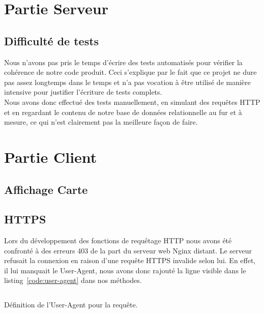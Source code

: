 \section{Partie Serveur}
	\subsection{Difficulté de tests}
		Nous n'avons pas pris le temps d'écrire des tests automatisés pour vérifier la cohérence de notre code produit. Ceci s'explique par le fait que ce projet ne dure pas assez longtemps dans le temps et n'a pas vocation à être utilisé de manière intensive pour justifier l'écriture de tests complets.\\

		Nous avons donc effectué des tests manuellement, en simulant des requêtes HTTP et en regardant le contenu de notre base de données relationnelle au fur et à mesure, ce qui n'est clairement pas la meilleure façon de faire.

\section{Partie Client}
	\subsection{Affichage Carte}
	\subsection{HTTPS}
		Lors du développement des fonctions de requêtage HTTP nous avons été confronté à des erreurs 403 de la part du serveur web Nginx distant. Le serveur refusait la connexion en raison d'une requête HTTPS invalide selon lui. En effet, il lui manquait le User-Agent, nous avons donc rajouté la ligne visible dans le listing~\ref{code:user-agent} dans nos méthodes.

		\begin{code}
			\inputminted[fontsize=\small]{java}{code/user-agent.java}
			\caption{Définition de l'User-Agent pour la requête.}
			\label{code:user-agent}
		\end{code}
